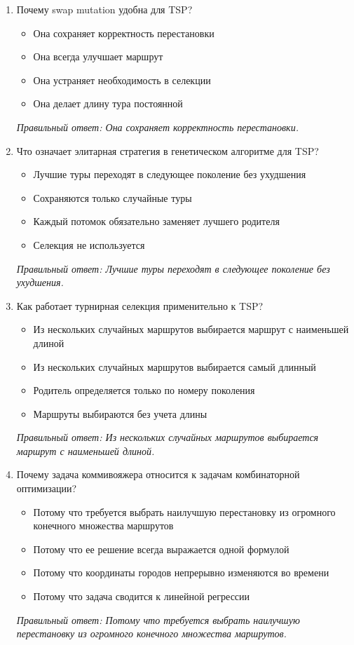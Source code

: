 \begin{enumerate}[label=\textbf{\arabic*.}, leftmargin=0pt, itemsep=1.2em]
\item Почему swap mutation удобна для TSP?
\begin{itemize}[label=$\square$, leftmargin=1.5cm, itemsep=0.2em, topsep=0.3em]
\item Она сохраняет корректность перестановки
\item Она всегда улучшает маршрут
\item Она устраняет необходимость в селекции
\item Она делает длину тура постоянной
\end{itemize}
{\small\textit{Правильный ответ: Она сохраняет корректность перестановки.}}

\item Что означает элитарная стратегия в генетическом алгоритме для TSP?
\begin{itemize}[label=$\square$, leftmargin=1.5cm, itemsep=0.2em, topsep=0.3em]
\item Лучшие туры переходят в следующее поколение без ухудшения
\item Сохраняются только случайные туры
\item Каждый потомок обязательно заменяет лучшего родителя
\item Селекция не используется
\end{itemize}
{\small\textit{Правильный ответ: Лучшие туры переходят в следующее поколение без ухудшения.}}

\item Как работает турнирная селекция применительно к TSP?
\begin{itemize}[label=$\square$, leftmargin=1.5cm, itemsep=0.2em, topsep=0.3em]
\item Из нескольких случайных маршрутов выбирается маршрут с наименьшей длиной
\item Из нескольких случайных маршрутов выбирается самый длинный
\item Родитель определяется только по номеру поколения
\item Маршруты выбираются без учета длины
\end{itemize}
{\small\textit{Правильный ответ: Из нескольких случайных маршрутов выбирается маршрут с наименьшей длиной.}}

\item Почему задача коммивояжера относится к задачам комбинаторной оптимизации?
\begin{itemize}[label=$\square$, leftmargin=1.5cm, itemsep=0.2em, topsep=0.3em]
\item Потому что требуется выбрать наилучшую перестановку из огромного конечного множества маршрутов
\item Потому что ее решение всегда выражается одной формулой
\item Потому что координаты городов непрерывно изменяются во времени
\item Потому что задача сводится к линейной регрессии
\end{itemize}
{\small\textit{Правильный ответ: Потому что требуется выбрать наилучшую перестановку из огромного конечного множества маршрутов.}}


\end{enumerate}
